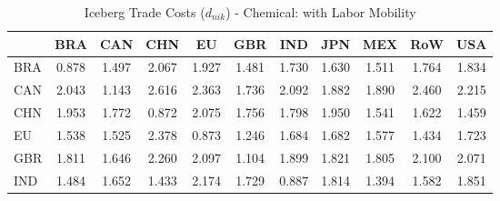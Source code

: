 \begin{table}[htbp]
\centering
\caption{Iceberg Trade Costs ($d_{nik}$) - Chemical: with Labor Mobility} 
\label{tab:iceberg_Chemical}
\begin{tabular}{lcccccccccc}
  \hline
 & BRA & CAN & CHN & EU & GBR & IND & JPN & MEX & RoW & USA \\ 
  \hline
BRA & \textcolor[RGB]{242,157,13}{0.878} & \textcolor[RGB]{191,124,64}{1.497} & \textcolor[RGB]{33,21,222}{2.067} & \textcolor[RGB]{59,38,196}{1.927} & \textcolor[RGB]{196,127,59}{1.481} & \textcolor[RGB]{122,79,133}{1.730} & \textcolor[RGB]{150,97,105}{1.630} & \textcolor[RGB]{189,122,66}{1.511} & \textcolor[RGB]{107,69,148}{1.764} & \textcolor[RGB]{79,51,176}{1.834} \\ 
  CAN & \textcolor[RGB]{36,23,219}{2.043} & \textcolor[RGB]{230,148,26}{1.143} & \textcolor[RGB]{0,0,255}{2.616} & \textcolor[RGB]{10,7,245}{2.363} & \textcolor[RGB]{117,76,138}{1.736} & \textcolor[RGB]{25,16,230}{2.092} & \textcolor[RGB]{66,43,189}{1.882} & \textcolor[RGB]{64,41,191}{1.890} & \textcolor[RGB]{3,2,252}{2.460} & \textcolor[RGB]{15,10,240}{2.215} \\ 
  CHN & \textcolor[RGB]{48,31,207}{1.953} & \textcolor[RGB]{102,66,153}{1.772} & \textcolor[RGB]{247,160,8}{0.872} & \textcolor[RGB]{28,18,227}{2.075} & \textcolor[RGB]{110,71,145}{1.756} & \textcolor[RGB]{97,63,158}{1.798} & \textcolor[RGB]{51,33,204}{1.950} & \textcolor[RGB]{176,114,79}{1.541} & \textcolor[RGB]{153,99,102}{1.622} & \textcolor[RGB]{199,129,56}{1.459} \\ 
  EU & \textcolor[RGB]{178,115,76}{1.538} & \textcolor[RGB]{181,117,74}{1.525} & \textcolor[RGB]{8,5,247}{2.378} & \textcolor[RGB]{245,158,10}{0.873} & \textcolor[RGB]{224,145,31}{1.246} & \textcolor[RGB]{133,86,122}{1.684} & \textcolor[RGB]{135,87,120}{1.682} & \textcolor[RGB]{163,106,92}{1.577} & \textcolor[RGB]{207,134,48}{1.434} & \textcolor[RGB]{128,82,128}{1.723} \\ 
  GBR & \textcolor[RGB]{92,59,163}{1.811} & \textcolor[RGB]{145,94,110}{1.646} & \textcolor[RGB]{13,8,242}{2.260} & \textcolor[RGB]{23,15,232}{2.097} & \textcolor[RGB]{232,150,23}{1.104} & \textcolor[RGB]{61,40,194}{1.899} & \textcolor[RGB]{82,53,173}{1.821} & \textcolor[RGB]{94,61,161}{1.805} & \textcolor[RGB]{20,13,235}{2.100} & \textcolor[RGB]{31,20,224}{2.071} \\ 
  IND & \textcolor[RGB]{194,125,61}{1.484} & \textcolor[RGB]{143,92,112}{1.652} & \textcolor[RGB]{209,135,46}{1.433} & \textcolor[RGB]{18,12,237}{2.174} & \textcolor[RGB]{125,81,130}{1.729} & \textcolor[RGB]{240,155,15}{0.887} & \textcolor[RGB]{89,58,166}{1.814} & \textcolor[RGB]{219,142,36}{1.394} & \textcolor[RGB]{161,104,94}{1.582} & \textcolor[RGB]{74,48,181}{1.851} \\ 

\end{tabular}
\end{table}
